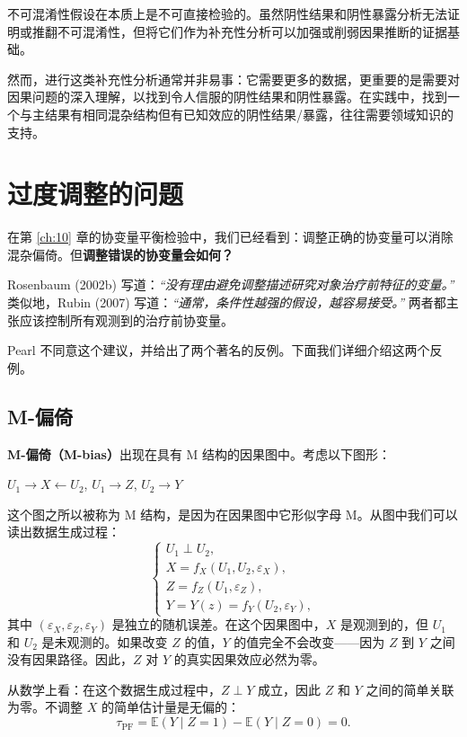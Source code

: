 不可混淆性假设在本质上是不可直接检验的。虽然阴性结果和阴性暴露分析无法证明或推翻不可混淆性，但将它们作为补充性分析可以加强或削弱因果推断的证据基础。

然而，进行这类补充性分析通常并非易事：它需要更多的数据，更重要的是需要对因果问题的深入理解，以找到令人信服的阴性结果和阴性暴露。在实践中，找到一个与主结果有相同混杂结构但有已知效应的阴性结果/暴露，往往需要领域知识的支持。

\section{过度调整的问题}\label{sec:16-over-adjustment}

在第 \ref{ch:10} 章的协变量平衡检验中，我们已经看到：调整正确的协变量可以消除混杂偏倚。但\textbf{调整错误的协变量会如何？}

Rosenbaum (2002b) 写道：\textit{``没有理由避免调整描述研究对象治疗前特征的变量。''} 类似地，Rubin (2007) 写道：\textit{``通常，条件性越强的假设，越容易接受。''} 两者都主张应该控制所有观测到的治疗前协变量。

Pearl 不同意这个建议，并给出了两个著名的反例。下面我们详细介绍这两个反例。

\subsection{M-偏倚}\label{sec:16-m-bias}

\textbf{M-偏倚（M-bias）}出现在具有 M 结构的因果图中。考虑以下图形：

\begin{center}
$U_1 \to X \leftarrow U_2$, $U_1 \to Z$, $U_2 \to Y$
\end{center}

这个图之所以被称为 M 结构，是因为在因果图中它形似字母 M。从图中我们可以读出数据生成过程：
\[
\begin{cases}
U_1 \perp U_2, \\
X = f_X(U_1, U_2, \varepsilon_X), \\
Z = f_Z(U_1, \varepsilon_Z), \\
Y = Y(z) = f_Y(U_2, \varepsilon_Y),
\end{cases}
\label{eq:16-m-bias-dgp}
\tag{16.8}
\]
其中 $(\varepsilon_X, \varepsilon_Z, \varepsilon_Y)$ 是独立的随机误差。在这个因果图中，$X$ 是观测到的，但 $U_1$ 和 $U_2$ 是未观测的。如果改变 $Z$ 的值，$Y$ 的值完全不会改变——因为 $Z$ 到 $Y$ 之间没有因果路径。因此，$Z$ 对 $Y$ 的真实因果效应必然为零。

从数学上看：在这个数据生成过程中，$Z \perp Y$ 成立，因此 $Z$ 和 $Y$ 之间的简单关联为零。不调整 $X$ 的简单估计量是无偏的：
\[
\tau_{\mathrm{PF}} = \mathbb{E}(Y \mid Z = 1) - \mathbb{E}(Y \mid Z = 0) = 0 .
\label{eq:16-pfe-unbiased}
\tag{16.9}
\]

